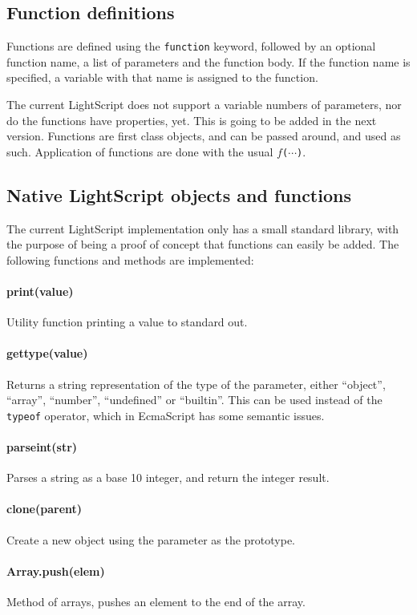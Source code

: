\documentclass[11pt]{report}
\begin{document}
\subsection{Function definitions}
Functions are defined using the \verb|function| keyword, followed by an optional function name, a list of parameters and the function body.
If the function name is specified, a variable with that name is assigned to the function.

The current LightScript does not support a variable numbers of parameters, nor do the functions have properties, yet.
This is going to be added in the next version.
Functions are first class objects, and can be passed around, and used as such. Application of functions are done with the usual $f$\verb|(|$\cdots$\verb|)|.

\subsection{Native LightScript objects and functions}
The current LightScript implementation only has a small standard library, with the purpose of being a proof of concept that functions can easily be added. The following functions and methods are implemented:

\paragraph{print(value)} Utility function printing a value to standard out.
\paragraph{gettype(value)} Returns a string representation of the type of the parameter, either ``object'', ``array'', ``number'', ``undefined'' or ``builtin''. This can be used instead of the \verb|typeof| operator, which in EcmaScript has some semantic issues.
\paragraph{parseint(str)} Parses a string as a base 10 integer, and return the integer result.
\paragraph{clone(parent)} Create a new object using the parameter as the prototype.
\paragraph{Array.push(elem)} Method of arrays, pushes an element to the end of the array.
\end{document}
